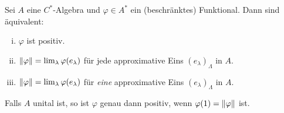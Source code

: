 \begin{satz}[label=satz:54,{name=[Äquivalenzen zur Positivität von Funktionalen]}]
	Sei $A$ eine $C^*$-Algebra und $\varphi \in A^*$ ein (beschränktes) Funktional. Dann sind äquivalent:
	\begin{enumerate}[(i),itemsep=0pt]
		\item $\varphi$ ist positiv.
		\item $\norm*{\varphi} = \lim_\lambda\varphi(e_\lambda)$ für jede approximative Eins $(e_\lambda)_\Lambda$ in $A$.
		\item $\norm*{\varphi} = \lim_\lambda\varphi(e_\lambda)$ für \emph{eine} approximative Eins $(e_\lambda)_\Lambda$ in $A$.
	\end{enumerate}
	Falls $A$ unital ist, so ist $\varphi$ genau dann positiv, wenn $\varphi(1)=\norm*{\varphi}$ ist.
\end{satz}
